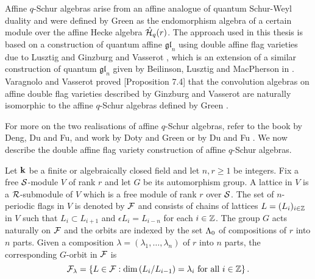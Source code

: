 \documentclass[a4paper, 11pt, twoside]{report}
\begin{document}
Affine $q$-Schur algebras arise from an affine analogue of quantum Schur-Weyl duality and were defined by Green \cite{green99} as the endomorphism algebra of a certain module over the affine Hecke algebra $\hat{\mathcal{H}}_q(r)$. The approach used in this thesis is based on a construction of quantum affine $\mathfrak{gl}_n$ using double affine flag varieties due to Lusztig \cite{lusztig99} and Ginzburg and Vasserot \cite{ginzburg93}, which is an extension of a similar construction of quantum $\mathfrak{gl}_n$ given by Beilinson, Lusztig and MacPherson in \cite{blm90}. Varagnolo and Vasserot proved \cite{varagnolo99}[Proposition 7.4] that the convolution algebras on affine double flag varieties described by Ginzburg and Vasserot are naturally isomorphic to the affine $q$-Schur algebras defined by Green \cite{green99}.

For more on the two realisations of affine $q$-Schur algebras, refer to the book \cite{deng12book} by Deng, Du and Fu, and work by Doty and Green \cite{doty07} or by Du and Fu \cite{du15}. We now describe the double affine flag variety construction of affine $q$-Schur algebras.

Let $\mathbf{k}$ be a finite or algebraically closed field and let $n,r\geq 1$ be integers. Fix a free $\mathcal{S}$-module $V$ of rank $r$ and let $G$ be its automorphism group. A lattice in $V$ is a $\mathcal{R}$-submodule of $V$ which is a free module of rank $r$ over $\mathcal{S}$. The set of $n$-periodic flags in $V$ is denoted by $\mathcal{F}$ and consists of chains of lattices $L=(L_i)_{i\in\mathbb{Z}}$ in $V$ such that $L_i\subset L_{i+1}$ and $\epsilon L_i = L_{i-n}$ for each $i\in\mathbb{Z}$. The group $G$ acts naturally on $\mathcal{F}$ and the orbits are indexed by the set $\Lambda_0{}$ of compositions of $r$ into $n$ parts. Given a composition $\lambda=(\lambda_1,\ldots,\lambda_n)$ of $r$ into $n$ parts, the corresponding $G$-orbit in $\mathcal{F}$ is
\begin{equation*}
\mathcal{F}_\lambda = \left\{L\in\mathcal{F}:\dim\left(L_i/{L_{i-1}}\right)=\lambda_i \text{ for all }i\in\mathbb{Z}\right\}.
\end{equation*}
\end{document}
